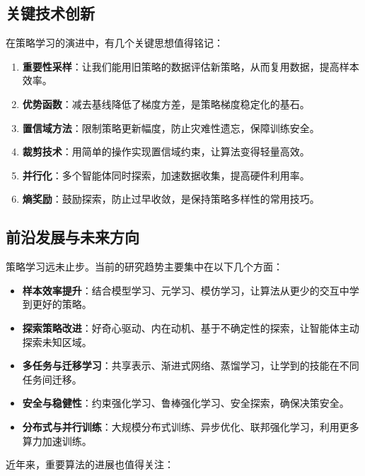 \documentclass[lang=cn,zihao=-4,a4paper,fontset=windows]{beautybook}
\begin{document}
\subsection{关键技术创新}

在策略学习的演进中，有几个关键思想值得铭记：

\begin{enumerate}
    \item \textbf{重要性采样}：让我们能用旧策略的数据评估新策略，从而复用数据，提高样本效率。
    \item \textbf{优势函数}：减去基线降低了梯度方差，是策略梯度稳定化的基石。
    \item \textbf{置信域方法}：限制策略更新幅度，防止灾难性遗忘，保障训练安全。
    \item \textbf{裁剪技术}：用简单的操作实现置信域约束，让算法变得轻量高效。
    \item \textbf{并行化}：多个智能体同时探索，加速数据收集，提高硬件利用率。
    \item \textbf{熵奖励}：鼓励探索，防止过早收敛，是保持策略多样性的常用技巧。
\end{enumerate}

\subsection{前沿发展与未来方向}

策略学习远未止步。当前的研究趋势主要集中在以下几个方面：

\begin{itemize}
    \item \textbf{样本效率提升}：结合模型学习、元学习、模仿学习，让算法从更少的交互中学到更好的策略。
    \item \textbf{探索策略改进}：好奇心驱动、内在动机、基于不确定性的探索，让智能体主动探索未知区域。
    \item \textbf{多任务与迁移学习}：共享表示、渐进式网络、蒸馏学习，让学到的技能在不同任务间迁移。
    \item \textbf{安全与稳健性}：约束强化学习、鲁棒强化学习、安全探索，确保决策安全。
    \item \textbf{分布式与并行训练}：大规模分布式训练、异步优化、联邦强化学习，利用更多算力加速训练。
\end{itemize}

近年来，重要算法的进展也值得关注：
\end{document}
